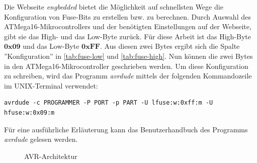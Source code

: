 Die Webseite \textit{engbedded} \cite{Engbedded:Fusecalc} bietet die Möglichkeit auf schnellsten Wege die Konfiguration von Fuse-Bits zu erstellen bzw. zu berechnen. Durch Auswahl des ATMega16-Mikrocontrollers und der benötigten Einstellungen auf der Webseite, gibt sie das High- und das Low-Byte zurück. Für diese Arbeit ist das High-Byte $\mathbf{0x09}$ und das Low-Byte $\mathbf{0xFF}$. Aus diesen zwei Bytes ergibt sich die Spalte ''Konfiguration'' in \autoref{tab:fuse-low} und \autoref{tab:fuse-high}. Nun können die zwei Bytes in den ATMega16-Mikrocontroller geschrieben werden. Um diese Konfiguration zu schreiben, wird das Programm \textit{avrdude} \cite{GNU:Avrdude} mittels der folgenden Kommandozeile im UNIX-Terminal verwendet: %


\begin{verbatim}
avrdude -c PROGRAMMER -P PORT -p PART -U lfuse:w:0xff:m -U hfuse:w:0x09:m
\end{verbatim} 

Für eine ausführliche Erläuterung kann das Benutzerhandbuch \cite{AVRDUDE:Manual} des Programms \textit{avrdude} gelesen werden. \smallskip \smallskip

\begin{figure}[htbp]
	\centering
	\caption[AVR-Architektur]{AVR-Architektur \cite{Atmel:ATMega16}}\label{fig:avr}
\end{figure}

